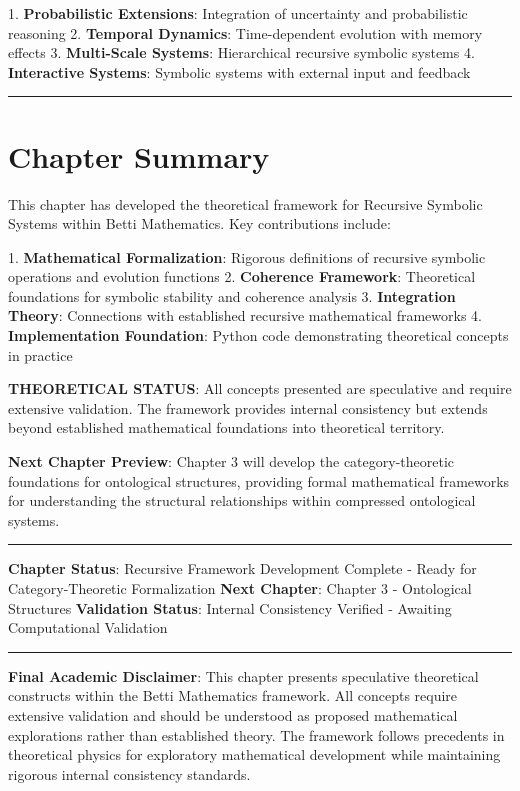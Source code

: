 1. \textbf{Probabilistic Extensions}: Integration of uncertainty and probabilistic reasoning
2. \textbf{Temporal Dynamics}: Time-dependent evolution with memory effects
3. \textbf{Multi-Scale Systems}: Hierarchical recursive symbolic systems
4. \textbf{Interactive Systems}: Symbolic systems with external input and feedback

\hrule

\section{Chapter Summary}

This chapter has developed the theoretical framework for Recursive Symbolic Systems within Betti Mathematics. Key contributions include:

1. \textbf{Mathematical Formalization}: Rigorous definitions of recursive symbolic operations and evolution functions
2. \textbf{Coherence Framework}: Theoretical foundations for symbolic stability and coherence analysis
3. \textbf{Integration Theory}: Connections with established recursive mathematical frameworks
4. \textbf{Implementation Foundation}: Python code demonstrating theoretical concepts in practice

\textbf{THEORETICAL STATUS}: All concepts presented are speculative and require extensive validation. The framework provides internal consistency but extends beyond established mathematical foundations into theoretical territory.

\textbf{Next Chapter Preview}: Chapter 3 will develop the category-theoretic foundations for ontological structures, providing formal mathematical frameworks for understanding the structural relationships within compressed ontological systems.

\hrule

\textbf{Chapter Status}: Recursive Framework Development Complete - Ready for Category-Theoretic Formalization  
\textbf{Next Chapter}: Chapter 3 - Ontological Structures  
\textbf{Validation Status}: Internal Consistency Verified - Awaiting Computational Validation

\hrule

\textbf{Final Academic Disclaimer}: This chapter presents speculative theoretical constructs within the Betti Mathematics framework. All concepts require extensive validation and should be understood as proposed mathematical explorations rather than established theory. The framework follows precedents in theoretical physics for exploratory mathematical development while maintaining rigorous internal consistency standards.